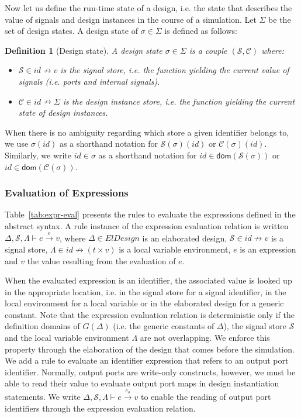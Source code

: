 \documentclass[pdflatex,sn-mathphys]{sn-jnl}%
\theoremstyle{thmstyleone}%
\theoremstyle{thmstyletwo}%
\theoremstyle{thmstylethree}%
\newtheorem{definition}{Definition}%
\begin{document}
Now let us define the run-time state of a design, i.e. the state that
describes the value of signals and design instances in the course of a
simulation. Let $\Sigma$ be the set of design states.  A design state
of $\sigma\in{}\Sigma$ is defined as follows:

\begin{definition}[Design state]
  \label{def:design-state}
  A design state $\sigma\in\Sigma$ is a couple
  $(\mathcal{S},\mathcal{C})$ where:
  \begin{itemize}[label=$-$]
  \item $\mathcal{S}\in{}id\nrightarrow{}v$ is the signal store,
    i.e. the function yielding the current value of signals
    (i.e. ports and internal signals).
  \item $\mathcal{C}\in{}id\nrightarrow{}\Sigma$ is the design
    instance store, i.e.  the function yielding the current state of
    design instances.
  \end{itemize}
\end{definition}

When there is no ambiguity regarding which store a given identifier
belongs to, we use $\sigma(id)$ as a shorthand notation for
$\mathcal{S}(\sigma)(id)$ or $\mathcal{C}(\sigma)(id)$.  Similarly, we
write $id\in\sigma$ as a shorthand notation for
$id\in\mathsf{dom}(\mathcal{S}(\sigma))$ or
$id\in\mathsf{dom}(\mathcal{C}(\sigma))$.

\subsubsection{Evaluation of Expressions}
\label{subsubsec:expr-eval}

Table~\ref{tab:expr-eval} presents the rules to evaluate the
expressions defined in the \hvhdl{} abstract syntax. A rule instance
of the expression evaluation relation is written
$\Delta,\mathcal{S},\Lambda\vdash{}e\xrightarrow{e}v$, where
$\Delta\in{}ElDesign$ is an elaborated design,
$\mathcal{S}\in{}id\nrightarrow{}v$ is a signal store,
$\Lambda\in{}id\nrightarrow(t\times{}v)$ is a local variable
environment, $e$ is an expression and $v$ the value resulting from the
evaluation of $e$.

When the evaluated expression is an identifier, the associated value
is looked up in the appropriate location, i.e. in the signal store for
a signal identifier, in the local environment for a local variable or
in the elaborated design for a generic constant. Note that the
expression evaluation relation is deterministic only if the definition
domains of $G(\Delta)$ (i.e. the generic constants of $\Delta$), the
signal store $\mathcal{S}$ and the local variable environment
$\Lambda$ are not overlapping. We enforce this property through the
elaboration of the design that comes before the simulation. We add a
rule to evaluate an identifier expression that refers to an output
port identifier. Normally, output ports are write-only constructs,
however, we must be able to read their value to evaluate output port
maps in design instantiation statements. We write
$\Delta,\mathcal{S},\Lambda\vdash{}e\xrightarrow{e_o}v$ to enable the
reading of output port identifiers through the expression evaluation
relation.
\end{document}
